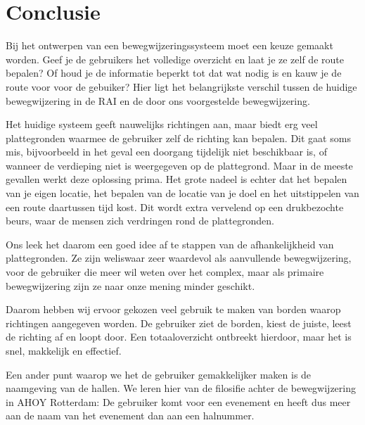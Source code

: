 \section{Conclusie}

Bij het ontwerpen van een bewegwijzeringssysteem moet een keuze gemaakt worden. Geef je de gebruikers het volledige overzicht en laat je ze zelf de route bepalen? Of houd je de informatie beperkt tot dat wat nodig is en kauw je de route voor voor de gebuiker? Hier ligt het belangrijkste verschil tussen de huidige bewegwijzering in de RAI en de door ons voorgestelde bewegwijzering.

Het huidige systeem geeft nauwelijks richtingen aan, maar biedt erg veel plattegronden waarmee de gebruiker zelf de richting kan bepalen. Dit gaat soms mis, bijvoorbeeld in het geval een doorgang tijdelijk niet beschikbaar is, of wanneer de verdieping niet is weergegeven op de plattegrond. Maar in de meeste gevallen werkt deze oplossing prima. Het grote nadeel is echter dat het bepalen van je eigen locatie, het bepalen van de locatie van je doel en het uitstippelen van een route daartussen tijd kost. Dit wordt extra vervelend op een drukbezochte beurs, waar de mensen zich verdringen rond de plattegronden.

Ons leek het daarom een goed idee af te stappen van de afhankelijkheid van plattegronden. Ze zijn weliswaar zeer waardevol als aanvullende bewegwijzering, voor de gebruiker die meer wil weten over het complex, maar als primaire bewegwijzering zijn ze naar onze mening minder geschikt.

Daarom hebben wij ervoor gekozen veel gebruik te maken van borden waarop richtingen aangegeven worden. De gebruiker ziet de borden, kiest de juiste, leest de richting af en loopt door. Een totaaloverzicht ontbreekt hierdoor, maar het is snel, makkelijk en effectief.

Een ander punt waarop we het de gebruiker gemakkelijker maken is de naamgeving van de hallen. We leren hier van de filosifie achter de bewegwijzering in AHOY Rotterdam: De gebruiker komt voor een evenement en heeft dus meer aan de naam van het evenement dan aan een halnummer.